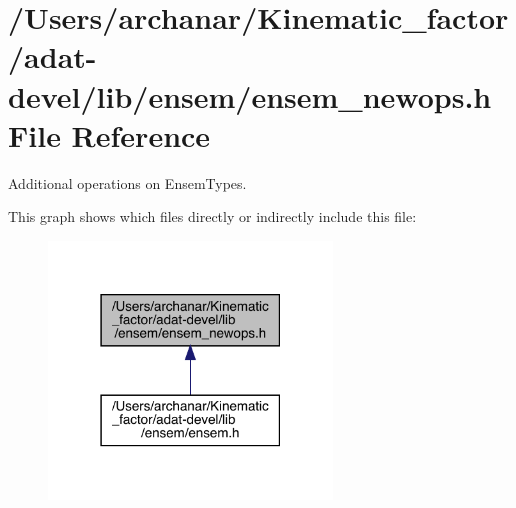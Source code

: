 \hypertarget{adat-devel_2lib_2ensem_2ensem__newops_8h}{}\section{/\+Users/archanar/\+Kinematic\+\_\+factor/adat-\/devel/lib/ensem/ensem\+\_\+newops.h File Reference}
\label{adat-devel_2lib_2ensem_2ensem__newops_8h}


Additional operations on Ensem\+Types.  


This graph shows which files directly or indirectly include this file\+:
\nopagebreak
\begin{figure}[H]
\begin{center}
\leavevmode
\includegraphics[width=214pt]{d0/d68/adat-devel_2lib_2ensem_2ensem__newops_8h__dep__incl}
\end{center}
\end{figure}
